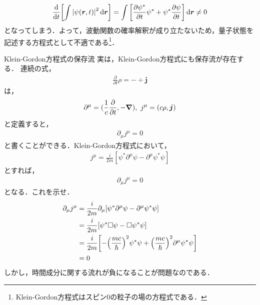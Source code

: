 \documentclass{report}
\begin{document}
    \begin{align}
      \dv{t}\qty[\int \abs{\psi(\bm{r}, t)}^2 \dd{\bm{r}}]= \int \qty[\pdv{\psi^*}{t}\psi^{*} + \psi^*\pdv{\psi}{t}] \dd{\bm{r}} \neq 0
    \end{align}
    となってしまう．よって，波動関数の確率解釈が成り立たないため，量子状態を記述する方程式として不適である\footnote{Klein-Gordon方程式はスピン0の粒子の場の方程式である．}．
    \begin{myexc}{Klein-Gordon方程式の保存流}{}
      実は，Klein-Gordon方程式にも保存流が存在する．
      連続の式，
      \begin{align}
        \frac{\partial}{\partial t}\rho = -\div \bm{j}
      \end{align}
      は，
      \begin{align}
        \partial^{\mu} = (\frac{1}{c}\frac{\partial}{\partial t}, -\grad ),\ j^\mu = (c\rho, \bm{j})
      \end{align}
      と定義すると，
      \begin{align}
        \partial_\mu j^\mu = 0
      \end{align}
      と書くことができる．Klein-Gordon方程式において，
      \begin{align}
        j^\mu = \frac{i}{2m}[\psi^{*}\partial^\mu\psi - \partial^\mu \psi^{*}\psi]
      \end{align}
      とすれば，
      \begin{align}
        \partial_\mu j^\mu = 0
      \end{align}
      となる．これを示せ．
      \tcblower
      \begin{align}
        \partial_\mu j^\mu &= \frac{i}{2m}\partial_\mu[\psi^{*}\partial^\mu\psi - \partial^\mu \psi^{*}\psi]\\
        &= \frac{i}{2m}[\psi^{*}\Box\psi - \Box \psi^{*}\psi]\\
        &= \frac{i}{2m}\qty[-\qty(\frac{mc}{\hbar})^2\psi^{*}\psi + \qty(\frac{mc}{\hbar})^2 \partial^\mu \psi^{*}\psi]\\
        &= 0
      \end{align}
      しかし，時間成分に関する流れが負になることが問題なのである．
      \end{myexc}
\end{document}
